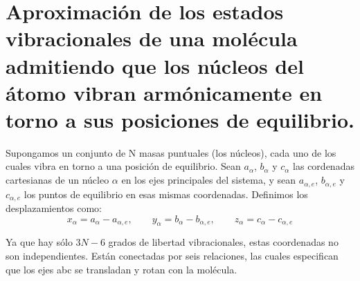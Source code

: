 \documentclass[a4paper]{article}
\begin{document}
\section{Aproximación de los estados vibracionales de una molécula admitiendo que los núcleos del átomo vibran armónicamente en torno a sus posiciones de equilibrio.}
Supongamos un conjunto de N masas puntuales (los núcleos), cada uno de los cuales vibra en torno a una posición de equilibrio. Sean $a_\alpha$, $b_\alpha$ y $c_\alpha$ las cordenadas cartesianas de un núcleo $\alpha$ en los ejes principales del sistema, y sean $a_{\alpha ,e}$, $b_{\alpha ,e}$ y $c_{\alpha ,e}$ los puntos de equilibrio en esas mismas coordenadas. Definimos los desplazamientos como:
\begin{equation}
x_\alpha = a_\alpha - a_{\alpha, e}, \qquad y_\alpha = b_\alpha - b_{\alpha, e}, \qquad z_\alpha = c_\alpha - c_{\alpha, e}
\end{equation}

Ya que hay sólo $3N-6$ grados de libertad vibracionales, estas coordenadas no son independientes. Están conectadas por seis relaciones, las cuales especifican que los ejes abc se transladan y rotan con la molécula.\\
\end{document}
